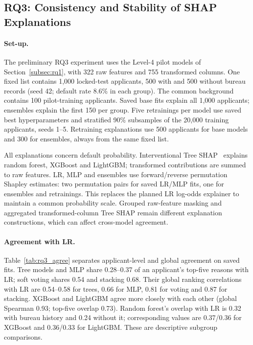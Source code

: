 \subsection{RQ3: Consistency and Stability of SHAP Explanations}
\label{subsec:rq3}
\paragraph{Set-up.}
The preliminary RQ3 experiment uses the Level-4 pilot models of Section~\ref{subsec:rq1}, with 322 raw features and 755 transformed columns. One fixed list contains 1,000 locked-test applicants, 500 with and 500 without bureau records (seed 42; default rate 8.6\% in each group). The common background contains 100 pilot-training applicants. Saved base fits explain all 1,000 applicants; ensembles explain the first 150 per group. Five retrainings per model use saved best hyperparameters and stratified 90\% subsamples of the 20,000 training applicants, seeds 1--5. Retraining explanations use 500 applicants for base models and 300 for ensembles, always from the same fixed list.

All explanations concern default probability. Interventional Tree SHAP~\cite{lundberg2020trees} explains random forest, XGBoost and LightGBM; transformed contributions are summed to raw features. LR, MLP and ensembles use forward/reverse permutation Shapley estimates: two permutation pairs for saved LR/MLP fits, one for ensembles and retrainings. This replaces the planned LR log-odds explainer to maintain a common probability scale. Grouped raw-feature masking and aggregated transformed-column Tree SHAP remain different explanation constructions, which can affect cross-model agreement.



\paragraph{Agreement with LR.}
Table~\ref{tab:rq3_agree} separates applicant-level and global agreement on saved fits. Tree models and MLP share 0.28--0.37 of an applicant's top-five reasons with LR; soft voting shares 0.54 and stacking 0.68. Their global ranking correlations with LR are 0.54--0.58 for trees, 0.66 for MLP, 0.81 for voting and 0.87 for stacking. XGBoost and LightGBM agree more closely with each other (global Spearman 0.93; top-five overlap 0.73). Random forest's overlap with LR is 0.32 with bureau history and 0.24 without it; corresponding values are 0.37/0.36 for XGBoost and 0.36/0.33 for LightGBM. These are descriptive subgroup comparisons.


